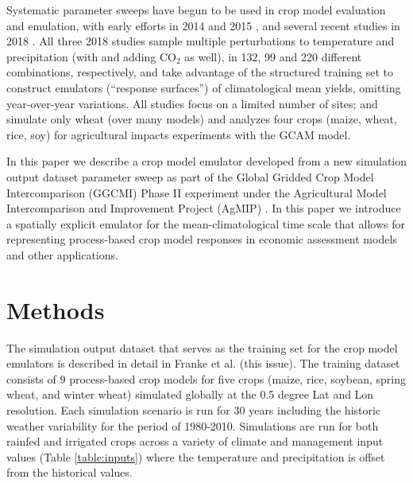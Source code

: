\documentclass[gmd, manuscript]{copernicus} %
\begin{document}
Systematic parameter sweeps have begun to be used in crop model evaluation and emulation, with early efforts in 2014 and 2015 \citep{ruane2014, Markowski2015, Pirttioja2015}, and several recent studies in 2018 \citep{FRONZEK20182, Snyder2018, RUIZRAMOS2018}. 
All three 2018 studies sample multiple perturbations to temperature and precipitation (with \citet{Snyder2018} and \citet{RUIZRAMOS2018} adding CO$_2$ as well), in 132, 99 and 220 different combinations, respectively, and take advantage of the structured training set to construct emulators (``response surfaces'') of climatological mean yields, omitting year-over-year variations. 
All studies focus on a limited number of sites; \citet{FRONZEK20182} and \citet{RUIZRAMOS2018} simulate only wheat (over many models) and \citet{Snyder2018} analyzes four crops (maize, wheat, rice, soy) for agricultural impacts experiments with the GCAM \citep{calvin2019} model.

In this paper we describe a crop model emulator developed from a new simulation output dataset parameter sweep as part of the Global Gridded Crop Model Intercomparison (GGCMI) Phase II experiment under the Agricultural Model Intercomparison and Improvement Project (AgMIP) \citep{ROSENZWEIG2013, Rosenzweig2014}. 
In this paper we introduce a spatially explicit emulator for the mean-climatological time scale that allows for representing process-based crop model responses in economic assessment models and other applications.

\section{Methods}
\label{S:2}
The simulation output dataset that serves as the training set for the crop model emulators is described in detail in Franke et al. (this issue). 
The training dataset consists of 9 process-based crop models for five crops (maize, rice, soybean, spring wheat, and winter wheat) simulated globally at the 0.5 degree Lat and Lon resolution. 
Each simulation scenario is run for 30 years including the historic weather variability for the period of 1980-2010. 
Simulations are run for both rainfed and irrigated crops across a variety of climate and management input values (Table \ref{table:inputs}) where the temperature and precipitation is offset from the historical values.
\end{document}
